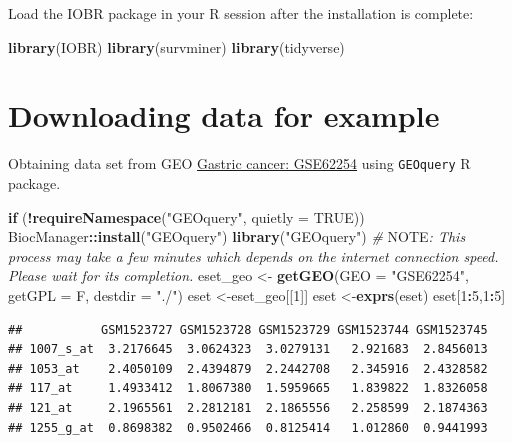 \documentclass[
  12pt,
]{book}
\newenvironment{Shaded}{\begin{snugshade}}{\end{snugshade}}
\newcommand{\AlertTok}[1]{\textcolor[rgb]{0.94,0.16,0.16}{#1}}
\newcommand{\AttributeTok}[1]{\textcolor[rgb]{0.13,0.29,0.53}{#1}}
\newcommand{\CommentTok}[1]{\textcolor[rgb]{0.56,0.35,0.01}{\textit{#1}}}
\newcommand{\ConstantTok}[1]{\textcolor[rgb]{0.56,0.35,0.01}{#1}}
\newcommand{\ControlFlowTok}[1]{\textcolor[rgb]{0.13,0.29,0.53}{\textbf{#1}}}
\newcommand{\DecValTok}[1]{\textcolor[rgb]{0.00,0.00,0.81}{#1}}
\newcommand{\FunctionTok}[1]{\textcolor[rgb]{0.13,0.29,0.53}{\textbf{#1}}}
\newcommand{\NormalTok}[1]{#1}
\newcommand{\OtherTok}[1]{\textcolor[rgb]{0.56,0.35,0.01}{#1}}
\newcommand{\SpecialCharTok}[1]{\textcolor[rgb]{0.81,0.36,0.00}{\textbf{#1}}}
\newcommand{\StringTok}[1]{\textcolor[rgb]{0.31,0.60,0.02}{#1}}
\theoremstyle{definition}
\theoremstyle{definition}
\theoremstyle{definition}
\theoremstyle{definition}
\theoremstyle{remark}
\begin{document}
Load the IOBR package in your R session after the installation is complete:

\begin{Shaded}
\begin{Highlighting}[]
\FunctionTok{library}\NormalTok{(IOBR)}
\FunctionTok{library}\NormalTok{(survminer)}
\FunctionTok{library}\NormalTok{(tidyverse)}
\end{Highlighting}
\end{Shaded}

\hypertarget{downloading-data-for-example-1}{%
\section{Downloading data for example}\label{downloading-data-for-example-1}}

Obtaining data set from GEO \href{https://pubmed.ncbi.nlm.nih.gov/25894828/}{Gastric cancer: GSE62254} using \texttt{GEOquery} R package.

\begin{Shaded}
\begin{Highlighting}[]
\ControlFlowTok{if}\NormalTok{ (}\SpecialCharTok{!}\FunctionTok{requireNamespace}\NormalTok{(}\StringTok{"GEOquery"}\NormalTok{, }\AttributeTok{quietly =} \ConstantTok{TRUE}\NormalTok{))  BiocManager}\SpecialCharTok{::}\FunctionTok{install}\NormalTok{(}\StringTok{"GEOquery"}\NormalTok{)}
\FunctionTok{library}\NormalTok{(}\StringTok{"GEOquery"}\NormalTok{)}
\CommentTok{\# }\AlertTok{NOTE}\CommentTok{: This process may take a few minutes which depends on the internet connection speed. Please wait for its completion.}
\NormalTok{eset\_geo }\OtherTok{\textless{}{-}} \FunctionTok{getGEO}\NormalTok{(}\AttributeTok{GEO     =} \StringTok{"GSE62254"}\NormalTok{, }\AttributeTok{getGPL  =}\NormalTok{ F, }\AttributeTok{destdir =} \StringTok{"./"}\NormalTok{)}
\NormalTok{eset    }\OtherTok{\textless{}{-}}\NormalTok{eset\_geo[[}\DecValTok{1}\NormalTok{]]}
\NormalTok{eset    }\OtherTok{\textless{}{-}}\FunctionTok{exprs}\NormalTok{(eset)}
\NormalTok{eset[}\DecValTok{1}\SpecialCharTok{:}\DecValTok{5}\NormalTok{,}\DecValTok{1}\SpecialCharTok{:}\DecValTok{5}\NormalTok{]}
\end{Highlighting}
\end{Shaded}

\begin{verbatim}
##           GSM1523727 GSM1523728 GSM1523729 GSM1523744 GSM1523745
## 1007_s_at  3.2176645  3.0624323  3.0279131   2.921683  2.8456013
## 1053_at    2.4050109  2.4394879  2.2442708   2.345916  2.4328582
## 117_at     1.4933412  1.8067380  1.5959665   1.839822  1.8326058
## 121_at     2.1965561  2.2812181  2.1865556   2.258599  2.1874363
## 1255_g_at  0.8698382  0.9502466  0.8125414   1.012860  0.9441993
\end{verbatim}
\end{document}
